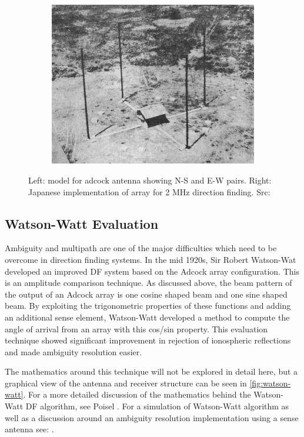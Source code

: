 \begin{figure}
\begin{subfigure}[b]{0.6\textwidth}
    \includegraphics[width=\textwidth]{./img/lit_review/adcock_implementation}
  \end{subfigure}
  \caption{Left: model for adcock antenna showing N-S and E-W pairs. Right: Japanese implementation of array for 2 MHz direction finding. Src: \cite{japanesecommunications}}
  \label{fig:lit_adcock_array}
\end{figure}


\subsection{Watson-Watt Evaluation}
Ambiguity and multipath are one of the major difficulties which need to be overcome in direction finding systems. 
In the mid 1920s, Sir Robert Watson-Wat developed an improved DF system based on the Adcock array configuration. This is an amplitude comparison technique. 
As discussed above, the beam pattern of the output of an Adcock array is one cosine shaped beam and one sine shaped beam. By exploiting the trigonometric properties of these functions and adding an additional sense element, Watson-Watt developed a method to compute the angle of arrival from an array with this cos/sin property. 
This evaluation technique showed significant improvement in rejection of ionospheric reflections and made ambiguity resolution easier.

The mathematics around this technique will not be explored in detail here, but a graphical view of the antenna and receiver structure can be seen in \autoref{fig:watson-watt}.
For a more detailed discussion of the mathematics behind the Watson-Watt DF algorithm, see Poisel \cite{poisel2008introduction}. For a simulation of Watson-Watt algorithm as well as a discussion around an ambiguity resolution implementation using a sense antenna see: \cite{adcockwatsonwattrdf}.

